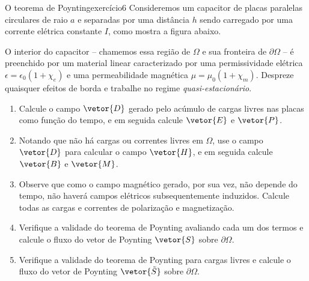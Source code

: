 \begin{exercício}{O teorema de Poynting}{exercício6}
    Consideremos um capacitor de placas paralelas circulares de raio \(a\) e separadas por uma distância \(h\) sendo carregado por uma corrente elétrica constante \(I\), como mostra a figura abaixo.
    \begin{center}
    \end{center}
    O interior do capacitor -- chamemos essa região de \(\Omega\) e sua fronteira de \(\partial \Omega\) -- é preenchido por um material linear caracterizado por uma permissividade elétrica \(\epsilon = \epsilon_0 (1 + \chi_e)\) e uma permeabilidade magnética \(\mu = \mu_0 (1 + \chi_m)\). Despreze quaisquer efeitos de borda e trabalhe no regime \emph{quasi-estacionário}.
    \begin{enumerate}[label=(\alph*)]
        \item Calcule o campo \(\vetor{D}\) gerado pelo acúmulo de cargas livres nas placas como função do tempo, e em seguida calcule \(\vetor{E}\) e \(\vetor{P}\).
        \item Notando que não há cargas ou correntes livres em \(\Omega\), use o campo \(\vetor{D}\) para calcular o campo \(\vetor{H}\), e em seguida calcule \(\vetor{B}\) e \(\vetor{M}\).
        \item Observe que como o campo magnético gerado, por sua vez, não depende do tempo, não haverá campos elétricos subsequentemente induzidos. Calcule todas as cargas e correntes de polarização e magnetização.
        \item Verifique a validade do teorema de Poynting avaliando cada um dos termos e calcule o fluxo do vetor de Poynting \(\vetor{S}\) sobre \(\partial \Omega\).
        \item Verifique a validade do teorema de Poynting para cargas livres e calcule o fluxo do vetor de Poynting \(\vetor{\tilde{S}}\) sobre \(\partial \Omega\).
    \end{enumerate}
\end{exercício}
